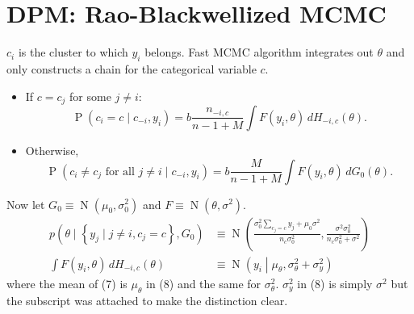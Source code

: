 \documentclass[11pt]{article}
\newcommand{\opn}{\operatorname}
\begin{document}
\section{DPM: Rao-Blackwellized MCMC}
$c_{i}$ is the cluster to which $y_{i}$ belongs. Fast MCMC algorithm integrates out $\theta$ and only constructs a chain for the categorical variable $c$.
\begin{itemize}
  \item If $c = c_{j}$ for some $j \neq i$:
    \begin{equation}
      \opn{P}\left(c_{i}=c\;|\;c_{-i}, y_{i}\right) = b\frac{n_{-i,c}}{n-1+M} \int F\left(y_{i}, \theta\right)\,dH_{-i,c}\left(\theta\right).
    \end{equation}
  \item Otherwise,
    \begin{equation}
      \opn{P}\left(c_{i}\neq c_{j}\text{ for all } j\neq i\;|\; c_{-i}, y_{i}\right) = b\frac{M}{n-1+M}\int F\left(y_{i}, \theta\right)\,dG_{0}\left(\theta\right).
    \end{equation}
\end{itemize}
Now let $G_{0} \equiv \opn{N}\left(\mu_{0}, \sigma_{0}^{2}\right)$ and $F \equiv \opn{N}\left(\theta, \sigma^{2}\right)$.
\begin{align}
  p\left(\theta\;|\;\left\{y_{j}\;|\; j\neq i, c_{j}=c\right\}, G_{0}\right) &\equiv \opn{N}\left(\frac{\sigma_{0}^{2}\sum_{c_{j}=c}y_{j} + \mu_{0}\sigma^{2}}{n_{c}\sigma_{0}^{2}}, \frac{\sigma^{2}\sigma_{0}^{2}}{n_{c}\sigma_{0}^{2} + \sigma^{2}} \right)\\
  \int F\left(y_{i},\theta\right)\,dH_{-i,c}\left(\theta\right) &\equiv \opn{N}\left(y_{i}\middle| \mu_{\theta}, \sigma_{\theta}^{2} + \sigma_{y}^{2}\right)
\end{align}
where the mean of (7) is $\mu_{\theta}$ in (8) and the same for $\sigma_{\theta}^{2}$. $\sigma_{y}^{2}$ in (8) is simply $\sigma^{2}$ but the subscript was attached to make the distinction clear.
\end{document}
